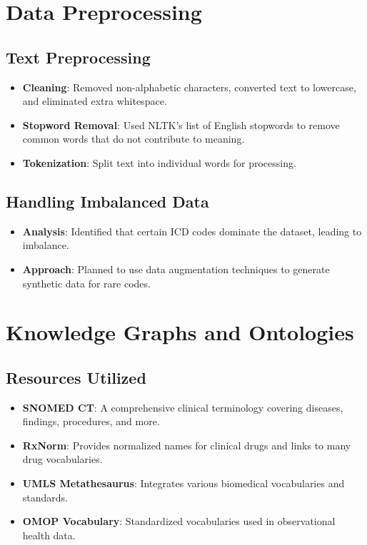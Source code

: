 \documentclass[12pt,a4paper]{report}
\begin{document}
\section{Data Preprocessing}

\subsection{Text Preprocessing}
\begin{itemize}
    \item \textbf{Cleaning}: Removed non-alphabetic characters, converted text to lowercase, and eliminated extra whitespace.
    \item \textbf{Stopword Removal}: Used NLTK's list of English stopwords to remove common words that do not contribute to meaning.
    \item \textbf{Tokenization}: Split text into individual words for processing.
\end{itemize}

\subsection{Handling Imbalanced Data}
\begin{itemize}
    \item \textbf{Analysis}: Identified that certain ICD codes dominate the dataset, leading to imbalance.
    \item \textbf{Approach}: Planned to use data augmentation techniques to generate synthetic data for rare codes.
\end{itemize}

\section{Knowledge Graphs and Ontologies}

\subsection{Resources Utilized}
\begin{itemize}
    \item \textbf{SNOMED CT}: A comprehensive clinical terminology covering diseases, findings, procedures, and more.
    \item \textbf{RxNorm}: Provides normalized names for clinical drugs and links to many drug vocabularies.
    \item \textbf{UMLS Metathesaurus}: Integrates various biomedical vocabularies and standards.
    \item \textbf{OMOP Vocabulary}: Standardized vocabularies used in observational health data.
\end{itemize}
\end{document}
